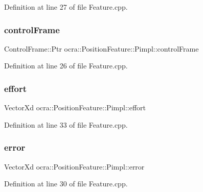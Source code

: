 Definition at line 27 of file Feature.\+cpp.

\hypertarget{structocra_1_1PositionFeature_1_1Pimpl_ad770aac1608c2e6ccf13ee84539313c5}{}\label{structocra_1_1PositionFeature_1_1Pimpl_ad770aac1608c2e6ccf13ee84539313c5} 
\subsubsection{\texorpdfstring{control\+Frame}{controlFrame}}
{\footnotesize\ttfamily Control\+Frame\+::\+Ptr ocra\+::\+Position\+Feature\+::\+Pimpl\+::control\+Frame}



Definition at line 26 of file Feature.\+cpp.

\hypertarget{structocra_1_1PositionFeature_1_1Pimpl_a66425331a37215913daa3ca7de5bce57}{}\label{structocra_1_1PositionFeature_1_1Pimpl_a66425331a37215913daa3ca7de5bce57} 
\subsubsection{\texorpdfstring{effort}{effort}}
{\footnotesize\ttfamily Vector\+Xd ocra\+::\+Position\+Feature\+::\+Pimpl\+::effort}



Definition at line 33 of file Feature.\+cpp.

\hypertarget{structocra_1_1PositionFeature_1_1Pimpl_ab0c14028446505c11d15d0dfce51b97a}{}\label{structocra_1_1PositionFeature_1_1Pimpl_ab0c14028446505c11d15d0dfce51b97a} 
\subsubsection{\texorpdfstring{error}{error}}
{\footnotesize\ttfamily Vector\+Xd ocra\+::\+Position\+Feature\+::\+Pimpl\+::error}



Definition at line 30 of file Feature.\+cpp.

